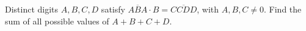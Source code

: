 Distinct digits $ A,B,C,D $ satisfy $\overline{ABA}\cdot B=\overline{CCDD}$, with $ A,B,C\ne0 $. Find the sum of all possible values of $ A+B+C+D $.
